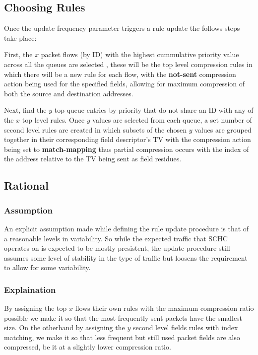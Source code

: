 \documentclass[12pt]{dalthesis}
\begin{document}
		\subsection{Choosing Rules}
		\par{
			Once the update frequency parameter triggers a rule update the follows steps take place: 
		}

		\par{
			First, the $x$ packet flows (by ID) with the highest cummulative priority value across all the queues are selected
			, these will be
			the top level compression rules in which there will be a new rule  for each flow, with the \textbf{not-sent} compression action being used for the
			specified fields, allowing for maximum compression of both the source and destination addresses.
		}
		\par{
			Next, find the $y$ top queue entries by priority that do not share an ID with any of the $x$ top level rules. Once $y$ values 
			are selected from each queue, a set number of second level rules are created in which subsets of the chosen $y$ values are 
			grouped together in their corresponding field descriptor's TV with the compression action being set to \textbf{match-mapping}
			thus partial compression occurs with the index of the address relative to the TV being sent as field residues.
	}

	\subsection{Rational}
	\subsubsection{Assumption}
	\par{
		An explicit assumption made while defining the rule update procedure is that of a reasonable levels in variability. So
		while the expected traffic that SCHC operates on is expected to be mostly presistent, the update procedure still assumes some level of 
		stability in the type of traffic but loosens the requirement to allow for some variability.
	}

	\subsubsection{Explaination}
	\par{
		By assigning the top $x$ flows their own rules with the maximum compression ratio possible we make it so that
		the most frequently sent packets have the smallest size. On the otherhand by assigning the $y$ second level fields
		rules with index matching, we make it so that less frequent but still used packet fields are also compressed, be it at a slightly lower compression
		ratio.
	}
\end{document}
